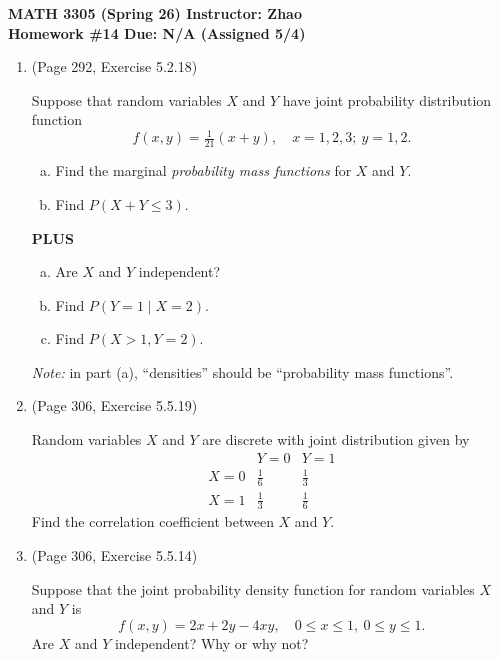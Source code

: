 \documentclass[12pt]{article}
\begin{document}
\begin{center}
  \textbf{\large MATH 3305 (Spring 26) \hfill Instructor: Zhao}\\[4pt]
  \textbf{\large Homework \#14 \hfill Due: N/A (Assigned 5/4)}
\end{center}

\bigskip

\begin{enumerate}
  \item (Page 292, Exercise 5.2.18)

    Suppose that random variables $X$ and $Y$ have joint probability distribution function
    \[
      f(x, y) = \tfrac{1}{21}(x + y), \quad x = 1, 2, 3;\ y = 1, 2.
    \]
    \begin{enumerate}[(a)]
      \item Find the marginal \textit{probability mass functions} for $X$ and $Y$.
      \item Find $P(X + Y \le 3)$.
    \end{enumerate}

    \textbf{PLUS}
    \begin{enumerate}[(c)]
      \item Are $X$ and $Y$ independent?
      \item Find $P(Y = 1 \mid X = 2)$.
      \item Find $P(X > 1, Y = 2)$.
    \end{enumerate}

    \textit{Note:} in part (a), ``densities'' should be ``probability mass functions''.

  \newpage
  \item (Page 306, Exercise 5.5.19)

    Random variables $X$ and $Y$ are discrete with joint distribution given by
    \[
      \begin{array}{c|cc}
        & Y = 0 & Y = 1 \\ \hline
        X = 0 & \tfrac{1}{6} & \tfrac{1}{3} \\[4pt]
        X = 1 & \tfrac{1}{3} & \tfrac{1}{6}
      \end{array}
    \]
    Find the correlation coefficient between $X$ and $Y$.

  \newpage
  \item (Page 306, Exercise 5.5.14)

    Suppose that the joint probability density function for random variables $X$ and $Y$ is
    \[
      f(x, y) = 2x + 2y - 4xy, \quad 0 \le x \le 1,\ 0 \le y \le 1.
    \]
    Are $X$ and $Y$ independent? Why or why not?


\end{enumerate}
\end{document}
